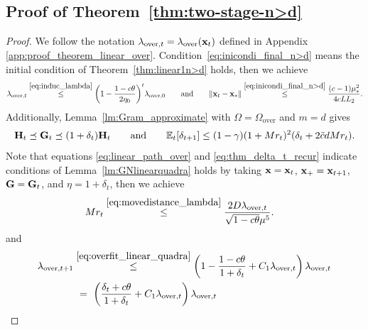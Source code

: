 \documentclass[11pt]{article}
\theoremstyle{plain}
\theoremstyle{definition}
\theoremstyle{remark}
\theoremstyle{plain}
\def\vx{{\bf{x}}}
\def\mG {{\bf G}}
\def\vx {{{\bf x}}}
\def\G{{\bf G}}
\def\H{{\bf H}}
\def\x{{\bf x}}
\begin{document}
\subsection{Proof of Theorem~\ref{thm:two-stage-n>d}}
\label{app:proof_theorem_two_stage_over}
\begin{proof}
We follow the notation  $\lambda_{\mathrm{over},t}=\lambda_{\mathrm{over}}(\x_t)$ defined in Appendix \ref{app:proof_theorem_linear_over}.
Condition~\eqref{eq:inicondi_final_n>d} means
the initial condition of Theorem~\ref{thm:linear1n>d} holds, then we achieve
\begin{align}
\label{eq:linear_path_over}
\lambda_{\mathrm{over},t}\overset{\eqref{eq:induc_lambda}}\leq \biggl(1-\frac{1-c\theta}{2\eta_0}\biggr)^t
\lambda_{\mathrm{over},0}
\qquad \text{and} \qquad
\|\x_t-\x_*\|\overset{\eqref{eq:inicondi_final_n>d}}{\leq}\frac{(c-1)\mu_*^2}{4cLL_2}.
\end{align}
Additionally, Lemma~\ref{lm:Gram_approximate} with $\Omega=\Omega_{\mathrm{over}}$ and $m=d$ gives
\begin{align}\label{eq:thm_delta_t_recur}
\H_t\preceq\G_t\preceq(1+\delta_t)\H_t
\qquad\text{and}\qquad
\mathbb E_t[\delta_{t+1}]
\leq(1-\gamma)(1+Mr_t)^2(\delta_t+2\tilde c dMr_t).
\end{align}
Note that equations \eqref{eq:linear_path_over} and \eqref{eq:thm_delta_t_recur} indicate conditions of
Lemma~\ref{lm:GNlinearquadra} holds by taking $\vx=\vx_t$, $\vx_+=\vx_{t+1}$, $\mG=\mG_t$, and $\eta=1+\delta_t$, then we achieve
\begin{align}
\label{eq:Mr_tboundedbylambda_t}
Mr_t
&\overset{\eqref{eq:movedistance_lambda}}{\leq}
\frac{2D\lambda_{\mathrm{over},t}}{\sqrt{1-c\theta}\mu^5}.
\end{align}
and
\begin{align}\label{eq:lambda_over_t+1boundbylambda_t}
\begin{split}    
\lambda_{\mathrm{over},t+1}
&\overset{\eqref{eq:overfit_linear_quadra}}{\leq}
\left(1-\frac{1-c\theta}{1+\delta_t}
+C_1\lambda_{\mathrm{over},t}\right)\lambda_{\mathrm{over},t} \\
&~=~ \left(\frac{\delta_t+c\theta}{1+\delta_t}
+C_1\lambda_{\mathrm{over},t}\right)\lambda_{\mathrm{over},t} \\

\end{split}
\end{align}
\end{proof}
\end{document}
